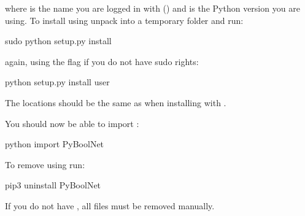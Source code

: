 \documentclass[letterpaper,10pt,english]{sphinxmanual}
\begin{document}
\begin{sphinxVerbatim}[commandchars=\\\{\}]
\end{sphinxVerbatim}

where  is the name you are logged in with () and  is the Python version you are using.
To install  using  unpack  into a temporary folder and run:

\begin{sphinxVerbatim}[commandchars=\\\{\}]
\PYGZdl{} sudo python setup.py install
\end{sphinxVerbatim}

again, using the  flag if you do not have sudo rights:

\begin{sphinxVerbatim}[commandchars=\\\{\}]
\PYGZdl{} python setup.py install \PYGZhy{}\PYGZhy{}user
\end{sphinxVerbatim}

The locations should be the same as when installing with .

You should now be able to import :

\begin{sphinxVerbatim}[commandchars=\\\{\}]
\PYGZdl{} python
\PYGZgt{}\PYGZgt{}\PYGZgt{} import PyBoolNet
\end{sphinxVerbatim}

To remove  using  run:

\begin{sphinxVerbatim}[commandchars=\\\{\}]
\PYGZdl{} pip3 uninstall PyBoolNet
\end{sphinxVerbatim}

If you do not have , all files must be removed manually.
\end{document}
